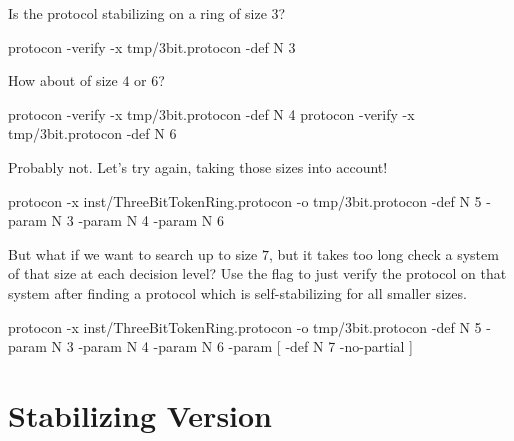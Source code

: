 Is the protocol stabilizing on a ring of size $3$?
\begin{code}
protocon -verify -x tmp/3bit.protocon -def N 3
\end{code}

How about of size $4$ or $6$?
\begin{code}
protocon -verify -x tmp/3bit.protocon -def N 4
protocon -verify -x tmp/3bit.protocon -def N 6
\end{code}

Probably not.
Let's try again, taking those sizes into account!
\begin{code}
protocon -x inst/ThreeBitTokenRing.protocon -o tmp/3bit.protocon -def N 5 -param N 3 -param N 4 -param N 6
\end{code}

But what if we want to search up to size $7$, but it takes too long check a system of that size at each decision level?
Use the  flag to just verify the protocol on that system after finding a protocol which is self-stabilizing for all smaller sizes.
\begin{code}
protocon -x inst/ThreeBitTokenRing.protocon -o tmp/3bit.protocon -def N 5 -param N 3 -param N 4 -param N 6 -param [ -def N 7 -no-partial ]
\end{code}

\section{Stabilizing Version}

